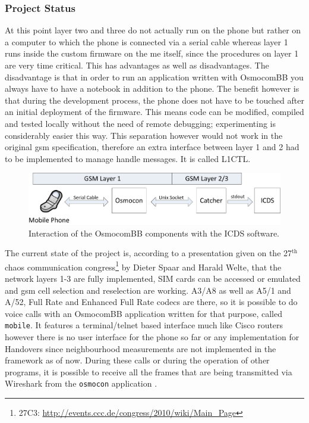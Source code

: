 \subsubsection{Project Status}
At this point layer two and three do not actually run on the phone but rather on a computer to which the phone is connected via a serial cable whereas layer 1 runs inside the custom firmware on the \gls{me} itself, since the procedures on layer 1 are very time critical.
This has advantages as well as disadvantages.
The disadvantage is that in order to run an application written with OsmocomBB you always have to have a notebook in addition to the phone.
The benefit however is that during the development process, the phone does not have to be touched after an initial deployment of the firmware.
This means code can be modified, compiled and tested locally without the need of remote debugging; experimenting is considerably easier this way.
This separation however would not work in the original \gls{gsm} specification, therefore an extra interface between layer 1 and 2 had to be implemented to manage handle messages.
It is called L1CTL.

\begin{figure}
\centering
\includegraphics{../Images/OsmoStructure}
\caption{Interaction of the OsmocomBB components with the ICDS software.}
\label{fig:osmo_setup}
\end{figure}

The current state of the project is, according to a presentation given on the 27$^\text{th}$ chaos communication congress\footnote{27C3: \url{http://events.ccc.de/congress/2010/wiki/Main_Page}} by Dieter Spaar and Harald Welte, that the network layers 1-3 are fully implemented, SIM cards can be accessed or emulated and \gls{gsm} cell selection and reselection are working.
A3/A8 as well as A5/1 and A/52, Full Rate and Enhanced Full Rate codecs are there, so it is possible to do voice calls with an OsmocomBB application written for that purpose, called \texttt{mobile}.
It features a terminal/telnet based interface much like Cisco routers however there is no user interface for the phone so far or any implementation for Handovers since neighbourhood measurements are not implemented in the framework as of now.
During these calls or during the operation of other programs, it is possible to receive all the frames that are being transmitted via Wireshark from the \texttt{osmocon} application \cite{konrad}.

